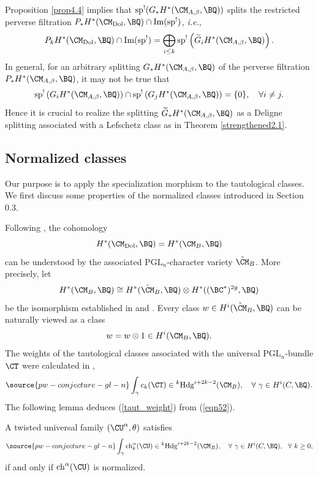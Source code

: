 \begin{rmk}
\notready\label{remark1}
Proposition \ref{prop4.4} implies that $\mathrm{sp}^!(G_*H^*(\CM_{A,\beta}, \BQ))$ splits the restricted perverse filtration $P_*H^*(\CM_{\mathrm{Dol}}, \BQ) \cap \mathrm{Im(sp^!)}$, \emph{i.e.},
\[
P_kH^*(\CM_{\mathrm{Dol}}, \BQ) \cap \mathrm{Im(sp^!)} = \bigoplus_{i\leq k} \mathrm{sp}^!\left( \widetilde{G}_iH^*(\CM_{A,\beta}, \BQ)\right).
\]
In general, for an arbitrary splitting $G_*H^*(\CM_{A,\beta}, \BQ)$ of the perverse filtration $P_*H^*(\CM_{A,\beta}, \BQ)$, it may not be true that
\[
\mathrm{sp}^!\left({G}_iH^*(\CM_{A,\beta}, \BQ) \right) \cap \mathrm{sp}^!\left({G}_jH^*(\CM_{A,\beta}, \BQ) \right) = \{0\}, \quad \forall i\neq j.
\]
Hence it is crucial to realize the splitting $\widetilde{G}_*H^*(\CM_{A,\beta}, \BQ)$ as a Deligne splitting associated with a Lefschetz class as in Theorem \ref{strengthened2.1}.
\end{rmk}



\subsection{Normalized classes} Our purpose is to apply the specialization morphism to the tautological classes. We first discuss some properties of the normalized classes introduced in Section 0.3.

Following \cite{HRV,HT1,Shende}, the cohomology
\[
H^*(\CM_{\mathrm{Dol}}, \BQ) = H^*(\CM_B, \BQ)
\]
can be understood by the associated $\mathrm{PGL}_n$-character variety $\tilde{\CM}_B$. More precisely, let
\[
H^*(\CM_B, \BQ) \cong H^*(\tilde{\CM}_B, \BQ) \otimes H^*((\BC^*)^{2g}, \BQ)
\]
be the isomorphism established in \cite[Section 1]{HT1} and \cite[Theorem 2.2.12]{HRV}. Every class $w \in H^i(\tilde{\CM}_B, \BQ)$ can be naturally viewed as a class
\[
w = w\otimes 1 \in H^i(\CM_B, \BQ).
\]
The weights of the tautological classes associated with the universal $\mathrm{PGL}_n$-bundle $\CT$ were calculated in \cite{Shende},
\begin{equation}\label{eqn52}
\source{pw-conjecture-gl-n}
\int_\gamma c_k(\CT) \in {^k\mathrm{Hdg}^{i+2k-2}(\CM_B)},\quad \forall~\gamma \in H^i(C, \BQ).
\end{equation}
The following lemma deduces (\ref{taut_weight}) from (\ref{eqn52}).

\begin{lem}
\notready\label{lem3.1}
A twisted universal family $(\CU^\alpha, \theta)$ satisfies
\begin{equation}\label{53}
\source{pw-conjecture-gl-n}
\int_\gamma \mathrm{ch}^\alpha_k(\CU) \in {^k\mathrm{Hdg}^{i+2k-2}(\CM_B)},\quad \forall~\gamma \in H^i(C, \BQ),~~ \forall~ k\geq 0,
\end{equation}
if and only if $\mathrm{ch}^\alpha(\CU)$ is normalized.
\end{lem}

